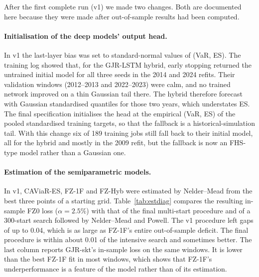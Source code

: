 After the first complete run (v1) we made two changes. Both are documented here because they were made after out-of-sample results had been computed.

\paragraph{Initialisation of the deep models' output head.} In v1 the last-layer bias was set to standard-normal values of (VaR, ES). The training log showed that, for the GJR-LSTM hybrid, early stopping returned the untrained initial model for all three seeds in the 2014 and 2024 refits. Their validation windows (2012--2013 and 2022--2023) were calm, and no trained network improved on a thin Gaussian tail there. The hybrid therefore forecast with Gaussian standardised quantiles for those two years, which understates ES. The final specification initialises the head at the empirical (VaR, ES) of the pooled standardised training targets, so that the fallback is a historical-simulation tail. With this change six of 189 training jobs still fall back to their initial model, all for the hybrid and mostly in the 2009 refit, but the fallback is now an FHS-type model rather than a Gaussian one.

\paragraph{Estimation of the semiparametric models.} In v1, CAViaR-ES, FZ-1F and FZ-Hyb were estimated by Nelder--Mead from the best three points of a starting grid. Table~\ref{tab:estdiag} compares the resulting in-sample FZ0 loss ($\alpha=2.5\%$) with that of the final multi-start procedure and of a 300-start search followed by Nelder--Mead and Powell. The v1 procedure left gaps of up to 0.04, which is as large as FZ-1F's entire out-of-sample deficit. The final procedure is within about 0.01 of the intensive search and sometimes better. The last column reports GJR-skt's in-sample loss on the same windows. It is lower than the best FZ-1F fit in most windows, which shows that FZ-1F's underperformance is a feature of the model rather than of its estimation.


